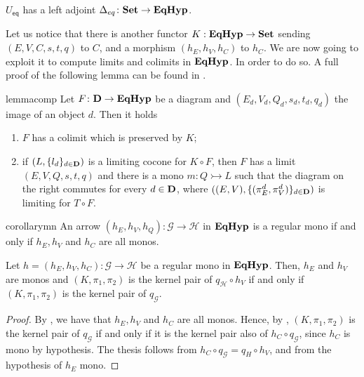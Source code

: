 \documentclass[a4paper,UKenglish,cleveref,pdftex,thm-restate,numberwithinsect]{lipics-v2021}
\newcommand{\eq}{\mathsf{eq}}
\newcommand{\Set}{\mathbf{Set}}
\def\D{\textbf {\textup{D}}}
\newcommand{\catname}[1]{\textbf{\textup{#1}}}
\newcommand{\EqHyp}{\catname{EqHyp}} %
\newcommand{\mto}{\rightarrowtail}
\begin{document}
\begin{corollary}\label{cor:ladj}
	$U_{\eq}$ has a left adjoint $\Delta_{\eq}\colon \Set \to \EqHyp$.
\end{corollary}

Let us notice that there is another functor $K: \EqHyp \to \Set$ sending $(E, V, C, s, t, q)$ to $C$, and a morphism $(h_E, h_V, h_C)$ to $h_C$. We are now going to exploit it to compute limits and colimits in $\EqHyp$. In order to do so. A full proof of the following lemma can be found in .

\noindent
\parbox{11.4cm}{
\begin{restatable}{lemma}{comp}\label{prop:eqhyp_complete}
Let $F\colon \D \to \EqHyp$ be a diagram and $(E_d, V_d, Q_d, s_d, t_d, q_d)$ the image of an object $d$. Then it holds
\begin{enumerate}
		\item $F$ has a colimit which is preserved by $K$;
	\item if $(L, \{l_d\}_{d\in \D})$ is a limiting cocone for $K \circ F$, then $F$ has a limit $(E, V, Q, s, t, q)$ and there is a mono $m\colon Q\mto L$ such that the diagram on the right commutes for every $d\in \D$, where $((E, V), \{(\pi^d_E, \pi^d_V)\}_{d\in \D})$ is limiting for $T\circ F$.
\end{enumerate}
\end{restatable}}\hfill 
\parbox{3cm}{}   

\begin{restatable}{corollary}{mn}\label{cor:mono2}
	An arrow $(h_E, h_V, h_Q): \mathcal{G\to H}$ in $\EqHyp$ is a regular mono if and only if $h_E, h_V$ and $h_C$ are all monos.
\end{restatable}


\iffalse 
\begin{proposition}
	Let $h = (h_E, h_V, h_C): \mathcal{G \to H}$ be a regular mono in $\EqHyp$.
	Then, $h_E$ and $h_V$ are monos and $(K, \pi_1, \pi_2)$ is the kernel pair of $q_\mathcal{H}\circ h_V$ if and only if $(K, \pi_1, \pi_2)$ is the kernel pair of $q_\mathcal{G}$.
\end{proposition}

\begin{proof}
	By , we have that $h_E, h_V$ and $h_C$ are all monos.
	Hence, by , $(K, \pi_1, \pi_2)$ is the kernel pair of $q_\mathcal{G}$ if and only if it is the kernel pair also of $h_C \circ q_\mathcal{G}$, since $h_C$ is mono by hypothesis.
	The thesis follows from $h_C \circ q_\mathcal{G} = q_H \circ h_V$, and from the hypothesis of $h_E$ mono.
\end{proof}
\end{document}
